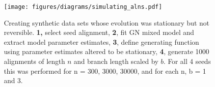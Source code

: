 \begin{figure}[!ht]
\centering
\texttt{[image: figures/diagrams/simulating\_alns.pdf]}
\caption{Creating synthetic data sets whose evolution was stationary but not reversible. \textbf{1,} select seed alignment, \textbf{2}, fit GN mixed model and extract model parameter estimates, \textbf{3}, define generating function using parameter estimates altered to be stationary, \textbf{4}, generate 1000 alignments of length $n$ and branch length scaled by $b$. For all 4 seeds this was performed for n = 300, 3000, 30000, and for each n, b = 1 and 3.}
\label{fig:simulating_alns}
\end{figure}